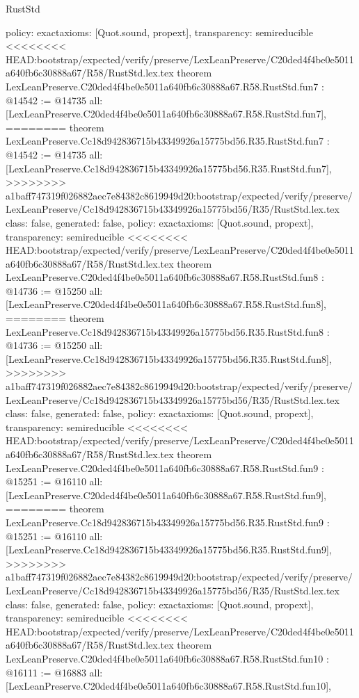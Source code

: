 \begin{lexlean}{RustStd}
\begin{coremodule}
{\begin{coremodule}
{{{{{{{{{{  policy: exact{axioms: [Quot.sound, propext]},
  transparency: semireducible
}
<<<<<<<< HEAD:bootstrap/expected/verify/preserve/LexLeanPreserve/C20ded4f4be0e5011a640fb6c30888a67/R58/RustStd.lex.tex
theorem LexLeanPreserve.C20ded4f4be0e5011a640fb6c30888a67.R58.RustStd.fun7 : @14542 := @14735 {
  all: [LexLeanPreserve.C20ded4f4be0e5011a640fb6c30888a67.R58.RustStd.fun7],
========
theorem LexLeanPreserve.Cc18d942836715b43349926a15775bd56.R35.RustStd.fun7 : @14542 := @14735 {
  all: [LexLeanPreserve.Cc18d942836715b43349926a15775bd56.R35.RustStd.fun7],
>>>>>>>> a1baff747319f026882aec7e84382c8619949d20:bootstrap/expected/verify/preserve/LexLeanPreserve/Cc18d942836715b43349926a15775bd56/R35/RustStd.lex.tex
  class: false,
  generated: false,
  policy: exact{axioms: [Quot.sound, propext]},
  transparency: semireducible
}
<<<<<<<< HEAD:bootstrap/expected/verify/preserve/LexLeanPreserve/C20ded4f4be0e5011a640fb6c30888a67/R58/RustStd.lex.tex
theorem LexLeanPreserve.C20ded4f4be0e5011a640fb6c30888a67.R58.RustStd.fun8 : @14736 := @15250 {
  all: [LexLeanPreserve.C20ded4f4be0e5011a640fb6c30888a67.R58.RustStd.fun8],
========
theorem LexLeanPreserve.Cc18d942836715b43349926a15775bd56.R35.RustStd.fun8 : @14736 := @15250 {
  all: [LexLeanPreserve.Cc18d942836715b43349926a15775bd56.R35.RustStd.fun8],
>>>>>>>> a1baff747319f026882aec7e84382c8619949d20:bootstrap/expected/verify/preserve/LexLeanPreserve/Cc18d942836715b43349926a15775bd56/R35/RustStd.lex.tex
  class: false,
  generated: false,
  policy: exact{axioms: [Quot.sound, propext]},
  transparency: semireducible
}
<<<<<<<< HEAD:bootstrap/expected/verify/preserve/LexLeanPreserve/C20ded4f4be0e5011a640fb6c30888a67/R58/RustStd.lex.tex
theorem LexLeanPreserve.C20ded4f4be0e5011a640fb6c30888a67.R58.RustStd.fun9 : @15251 := @16110 {
  all: [LexLeanPreserve.C20ded4f4be0e5011a640fb6c30888a67.R58.RustStd.fun9],
========
theorem LexLeanPreserve.Cc18d942836715b43349926a15775bd56.R35.RustStd.fun9 : @15251 := @16110 {
  all: [LexLeanPreserve.Cc18d942836715b43349926a15775bd56.R35.RustStd.fun9],
>>>>>>>> a1baff747319f026882aec7e84382c8619949d20:bootstrap/expected/verify/preserve/LexLeanPreserve/Cc18d942836715b43349926a15775bd56/R35/RustStd.lex.tex
  class: false,
  generated: false,
  policy: exact{axioms: [Quot.sound, propext]},
  transparency: semireducible
}
<<<<<<<< HEAD:bootstrap/expected/verify/preserve/LexLeanPreserve/C20ded4f4be0e5011a640fb6c30888a67/R58/RustStd.lex.tex
theorem LexLeanPreserve.C20ded4f4be0e5011a640fb6c30888a67.R58.RustStd.fun10 : @16111 := @16883 {
  all: [LexLeanPreserve.C20ded4f4be0e5011a640fb6c30888a67.R58.RustStd.fun10],
}}}}}}}}}}}}}
\end{coremodule}}
\end{coremodule}
\end{lexlean}
